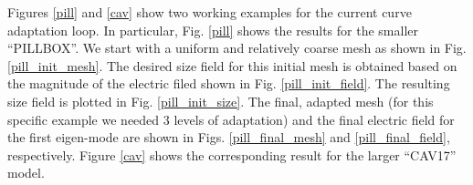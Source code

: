 \documentclass[review,12pt]{elsarticle_summary_report}
\begin{document}
Figures \ref{pill} and \ref{cav} show two working examples for the current curve adaptation loop.
In particular, Fig. \ref{pill} shows the results for the smaller ``PILLBOX''. We start with a uniform and relatively coarse mesh as shown in Fig. \ref{pill_init_mesh}. The desired size field for this initial mesh is obtained based on the magnitude of the electric filed shown in Fig. \ref{pill_init_field}. The resulting size field is plotted in Fig. \ref{pill_init_size}. The final, adapted mesh (for this specific example we needed 3 levels of adaptation) and the final electric field for the first eigen-mode are shown in Figs. \ref{pill_final_mesh} and \ref{pill_final_field}, respectively. Figure \ref{cav} shows the corresponding result for the larger ``CAV17'' model.
\begin{landscape}
\begin{figure}[ph!]
\centering
{}
\hspace*{50pt}
\\

\end{figure}
\end{landscape}
\end{document}
